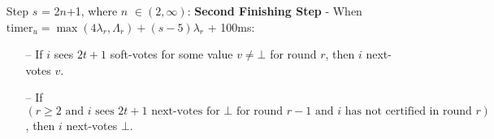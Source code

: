 \documentclass{article}
\begin{document}
\begin{enumerate}
        \item[] Step $s$ = 2$n$+1, where $n$ $\in (2, \infty)$: \textbf{Second Finishing Step} - When $\text{timer}_u = \max(4\lambda_r, \Lambda_r) + (s-5)\lambda_r$ + 100ms:
        \begin{itemize}
            \item[--] If $i$ sees $2t+1$ soft-votes for some value $v \neq \bot$ for round $r$, then $i$ next-votes $v$.
            \item[--] If $(r \geq 2 \text{ and } i \text{ sees } 2t+1 \text{ next-votes for } \bot \text{ for round } r-1 \text{ and } i \text{ has not certified in round } r)$, then $i$ next-votes $\bot$.
        \end{itemize}

    \end{enumerate}
\end{document}
